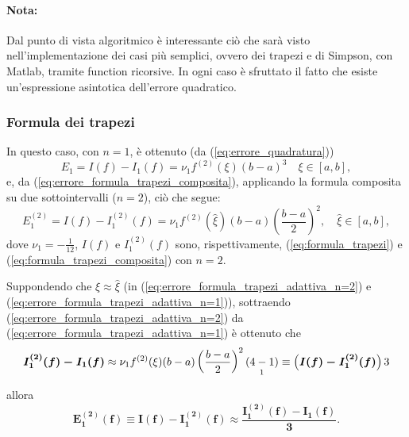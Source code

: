 \paragraph{Nota:} Dal punto di vista algoritmico è interessante ciò che sarà visto nell'implementazione dei casi più semplici, ovvero dei trapezi e di Simpson, con Matlab, tramite function ricorsive. In ogni caso è sfruttato il fatto che esiste un'espressione asintotica dell'errore quadratico.

\subsubsection{Formula dei trapezi}
In questo caso, con $n=1$, è ottenuto (da (\ref{eq:errore_quadratura}))
\begin{equation}\label{eq:errore_formula_trapezi_adattiva_n=1}
    E_1 = I(f)-I_1(f)=\nu_1 f^{(2)}(\xi)(b-a)^3\quad \xi\in[a,b],
\end{equation}
e, da (\ref{eq:errore_formula_trapezi_composita}), applicando la formula composita su due sottointervalli ($n=2$), ciò che segue:
\begin{equation}\label{eq:errore_formula_trapezi_adattiva_n=2}
    E_1^{(2)} = I(f)-I_1^{(2)}(f)=\nu_1 f^{(2)}(\widehat\xi)(b-a)\left(\frac{b-a}{2}\right)^2,\quad\widehat\xi\in [a,b],
\end{equation}
dove $\nu_1=-\frac{1}{12}$, $I(f)$ e $I_1^{(2)}(f)$ sono, rispettivamente, (\ref{eq:formula_trapezi}) e (\ref{eq:formula_trapezi_composita}) con $n=2$.

Suppondendo che $\xi\approx\widehat{\xi}$ (in (\ref{eq:errore_formula_trapezi_adattiva_n=2}) e (\ref{eq:errore_formula_trapezi_adattiva_n=1})), sottraendo (\ref{eq:errore_formula_trapezi_adattiva_n=2}) da (\ref{eq:errore_formula_trapezi_adattiva_n=1}) è ottenuto che
\begin{equation*}
    \boldsymbol{I_1^{(2)}(f)-I_1(f)}\approx\nu_1 f^{(2)}(\xi)(b-a)\left(\frac{b-a}{2}\right)^2\underset{\footnotemark}{(4-1)}\equiv \left(\boldsymbol{I(f)-I_1^{(2)}(f)}\right) 3
\end{equation*}
allora
\begin{equation*}
    \boldsymbol{E_1^{(2)}(f)\equiv I(f)-I_1^{(2)}(f)\approx\frac{I_1^{(2)}(f)-I_1(f)}{3}}.
\end{equation*}


